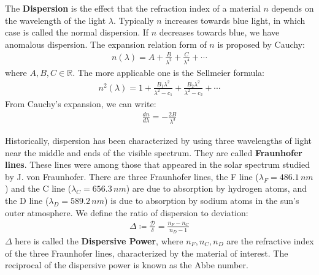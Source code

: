 \documentclass[11pt]{book}
\theoremstyle{break}
\theoremstyle{break}
\newcommand{\R}{\mathbb{R}}
\begin{document}
The \textbf{Dispersion} is the effect that the refraction index of a material $n$ depends on the wavelength of the light $\lambda$. Typically $n$ increases towards blue light, in which case is called the normal dispersion. If $n$ decreases towards blue, we have anomalous dispersion. The expansion relation form of $n$ is proposed by Cauchy:
\begin{align*}
n(\lambda) = A + \frac{B}{\lambda^2} + \frac{C}{\lambda^4}+ \cdots
\end{align*}
where $A,B,C \in \R$. The more applicable one is the Sellmeier formula:
\begin{align*}
n^2(\lambda) = 1+ \frac{B_1 \lambda^2}{\lambda^2 -c_1} + \frac{B_2\lambda^2}{\lambda^2 - c_2} + \cdots
\end{align*}
From Cauchy's expansion, we can write:
\begin{align*}
\frac{dn}{d\lambda} = -\frac{2B}{\lambda^3}
\end{align*}


Historically, dispersion has been characterized by using three wavelengths of light near the middle and ends of the visible spectrum. They are called 
\textbf{Fraunhofer lines}. These lines were among those that appeared in the solar
spectrum studied by J. von Fraunhofer. There are three Fraunhofer lines, the F line ($\lambda_F= 486.1\, nm$) and the C line ($\lambda_C = 656.3\,nm $) are due to absorption by hydrogen atoms, and the D line ($\lambda_D = 589.2\,nm$) is due to absorption by sodium atoms in the sun's outer atmosphere. We define the ratio of dispersion to deviation:
\begin{align*}
\Delta\coloneqq \frac{\mathcal{D}}{\delta} = \frac{n_F- n_C}{n_D - 1}
\end{align*}
$\Delta$ here is called the \textbf{Dispersive Power}, where $n_F, n_C, n_D$ are the refractive index of the three Fraunhofer lines, characterized by the material of interest. The reciprocal of the dispersive power is known as the Abbe number. \\
\end{document}
